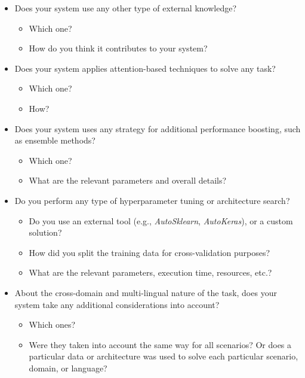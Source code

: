 \documentclass[
]{ceurart}
\begin{document}
\begin{itemize}
\begin{itemize}
        \end{itemize}
    \item Does your system use any other type of external knowledge?
        \begin{itemize}
            \item Which one?
            \item How do you think it contributes to your system?
        \end{itemize}
    \item Does your system applies attention-based techniques to solve any task?
        \begin{itemize}
            \item Which one?
            \item How?
        \end{itemize}
    \item Does your system uses any strategy for additional performance boosting, such as ensemble methods?
        \begin{itemize}
            \item Which one?
            \item What are the relevant parameters and overall details?
        \end{itemize}
    \item Do you perform any type of hyperparameter tuning or architecture search?
        \begin{itemize}
            \item Do you use an external tool (e.g., \textit{AutoSklearn}, \textit{AutoKeras}), or a 
                  custom solution?
            \item How did you split the training data for cross-validation purposes?
            \item What are the relevant parameters, execution time, resources, etc.?
        \end{itemize}
    \item About the cross-domain and multi-lingual nature of the task, does your system take any additional considerations into account?
        \begin{itemize}
            \item Which ones?
            \item Were they taken into account the same way for all scenarios? Or does a particular data or architecture was used to solve each particular scenario, domain, or language?
        \end{itemize}
\end{itemize}
\end{document}
